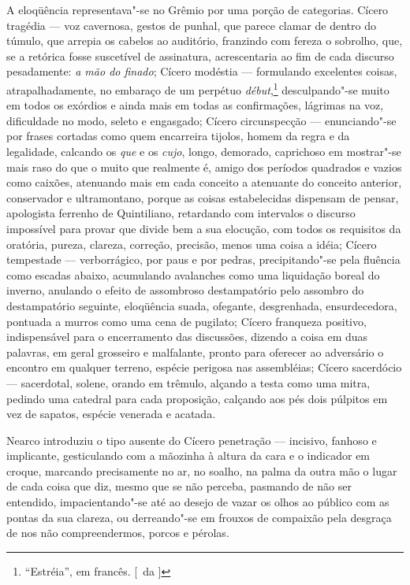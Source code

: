 A eloqüência representava"-se no Grêmio por uma
porção de categorias. Cícero tragédia --- voz cavernosa, gestos de
punhal, que parece clamar de dentro do túmulo, que arrepia os cabelos
ao auditório, franzindo com fereza o sobrolho, que, se a retórica fosse
suscetível de assinatura, acrescentaria ao fim de cada discurso
pesadamente: \textit{a mão do finado}; Cícero modéstia --- formulando excelentes
coisas, atrapalhadamente, no embaraço de um perpétuo \textit{début},\footnote{ ``Estréia'', 
em francês. [~da ]} desculpando"-se muito em todos os exórdios e ainda mais em todas as
confirmações, lágrimas na voz, dificuldade no modo, seleto e engasgado;
Cícero circunspecção --- enunciando"-se por frases cortadas como quem
encarreira tijolos, homem da regra e da legalidade, calcando os \textit{que} e
os \textit{cujo}, longo, demorado, caprichoso em mostrar"-se mais raso do que o
muito que realmente é, amigo dos períodos quadrados e vazios como
caixões, atenuando mais em cada conceito a atenuante do conceito
anterior, conservador e ultramontano, porque as coisas estabelecidas
dispensam de pensar, apologista ferrenho de Quintiliano, retardando com
intervalos o discurso impossível para provar que divide bem a sua
elocução, com todos os requisitos da oratória, pureza, clareza,
correção, precisão, menos uma coisa a idéia; Cícero tempestade --- 
verborrágico, por paus e por pedras, precipitando"-se pela fluência
como escadas abaixo, acumulando avalanches como uma liquidação boreal
do inverno, anulando o efeito de assombroso destampatório pelo assombro
do destampatório seguinte, eloqüência suada, ofegante, desgrenhada,
ensurdecedora, pontuada a murros como uma cena de pugilato; Cícero
franqueza positivo, indispensável para o encerramento das discussões,
dizendo a coisa em duas palavras, em geral grosseiro e malfalante,
pronto para oferecer ao adversário o encontro em qualquer terreno,
espécie perigosa nas assembléias; Cícero sacerdócio --- sacerdotal,
solene, orando em trêmulo, alçando a testa como uma mitra, pedindo uma
catedral para cada proposição, calçando aos pés dois púlpitos em vez de
sapatos, espécie venerada e acatada. 

Nearco introduziu o tipo ausente
do Cícero penetração --- incisivo, fanhoso e implicante, gesticulando
com a mãozinha à altura da cara e o indicador em croque, marcando
precisamente no ar, no soalho, na palma da outra mão o lugar de cada
coisa que diz, mesmo que se não perceba, pasmando de não ser entendido,
impacientando"-se até ao desejo de vazar os olhos ao público com as
pontas da sua clareza, ou derreando"-se em frouxos de compaixão pela
desgraça de nos não compreendermos, porcos e pérolas. 


